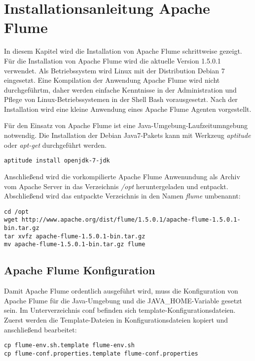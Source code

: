 \section{Installationsanleitung Apache Flume}
\label{section:flumeinstall}


In diesem Kapitel wird die Installation von Apache Flume schrittweise gezeigt. Für die Installation von Apache Flume wird die aktuelle Version 1.5.0.1 verwendet. Als Betriebssystem wird Linux mit der Distribution Debian 7 eingesetzt. Eine Kompilation der Anwendung Apache Flume wird nicht durchgeführtm, daher werden einfache Kenntnisse in der Administration und Pflege von Linux-Betriebssystemen in der Shell Bash vorausgesetzt. Nach der Installation wird eine kleine Anwendung eines Apache Flume Agenten vorgestellt. 

Für den Einsatz von Apache Flume ist eine Java-Umgebung-Laufzeitumngebung notwendig. Die Installation der Debian Java7-Pakets kann mit Werkzeug \textit{aptitude} oder \textit{apt-get} durchgeführt werden.

\begin{verbatim}
aptitude install openjdk-7-jdk	
\end{verbatim}

Anschließend wird die vorkompilierte Apache Flume Anwenundung als Archiv vom Apache Server in das Verzeichnis \textit{/opt} heruntergeladen und entpackt. Abschließend wird das entpackte Verzeichnis in den Namen \textit{flume} umbenannt:

\begin{verbatim}
cd /opt
wget http://www.apache.org/dist/flume/1.5.0.1/apache-flume-1.5.0.1-bin.tar.gz
tar xvfz apache-flume-1.5.0.1-bin.tar.gz
mv apache-flume-1.5.0.1-bin.tar.gz flume
\end{verbatim}

\subsection{Apache Flume Konfiguration}
\label{section:flumeKonfiguration}

Damit Apache Flume ordentlich ausgeführt wird, muss die Konfiguration von Apache Flume für die Java-Umgebung und die JAVA\_HOME-Variable gesetzt sein.
Im Unterverzeichnis conf befinden sich template-Konfigurationsdateien. Zuerst werden die Template-Dateien in Konfigurationsdateien kopiert und anschließend bearbeitet:

\begin{verbatim}
cp flume-env.sh.template flume-env.sh
cp flume-conf.properties.template flume-conf.properties
\end{verbatim}

